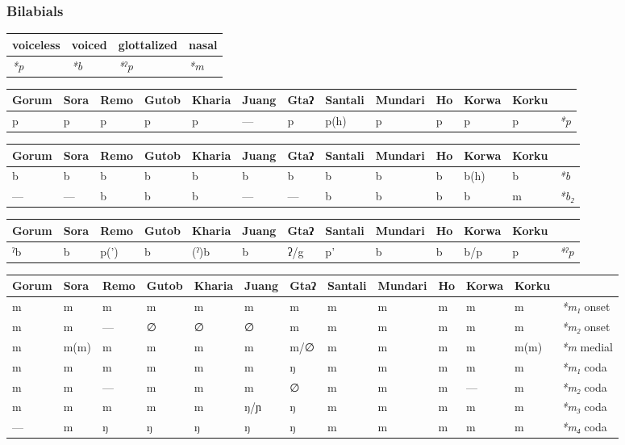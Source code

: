 \documentclass[a4paper,]{article}
\begin{document}
\subsubsection{Bilabials}\label{bilabials}

\begin{longtable}[]{@{}llll@{}}
\toprule
voiceless & voiced & glottalized & nasal\tabularnewline
\midrule
\endhead
\emph{*p} & \emph{*b} & \emph{*ˀp} & \emph{*m}\tabularnewline
\bottomrule
\end{longtable}

\begin{longtable}[]{@{}lllllllllllll@{}}
\toprule
Gorum & Sora & Remo & Gutob & Kharia & Juang & Gtaʔ & Santali & Mundari
& Ho & Korwa & Korku &\tabularnewline
\midrule
\endhead
p & p & p & p & p & --- & p & p(h) & p & p & p & p &
\emph{*p}\tabularnewline
\bottomrule
\end{longtable}

\begin{longtable}[]{@{}lllllllllllll@{}}
\toprule
Gorum & Sora & Remo & Gutob & Kharia & Juang & Gtaʔ & Santali & Mundari
& Ho & Korwa & Korku &\tabularnewline
\midrule
\endhead
b & b & b & b & b & b & b & b & b & b & b(h) & b &
\emph{*b}\tabularnewline
--- & --- & b & b & b & --- & --- & b & b & b & b & m &
\emph{*b₂}\tabularnewline
\bottomrule
\end{longtable}

\begin{longtable}[]{@{}lllllllllllll@{}}
\toprule
Gorum & Sora & Remo & Gutob & Kharia & Juang & Gtaʔ & Santali & Mundari
& Ho & Korwa & Korku &\tabularnewline
\midrule
\endhead
ˀb & b & p(') & b & (ˀ)b & b & ʔ/g & p' & b & b & b/p & p &
\emph{*ˀp}\tabularnewline
\bottomrule
\end{longtable}

\begin{longtable}[]{@{}lllllllllllll@{}}
\toprule
Gorum & Sora & Remo & Gutob & Kharia & Juang & Gtaʔ & Santali & Mundari
& Ho & Korwa & Korku &\tabularnewline
\midrule
\endhead
m & m & m & m & m & m & m & m & m & m & m & m & \emph{*m₁}
onset\tabularnewline
m & m & --- & ∅ & ∅ & ∅ & m & m & m & m & m & m & \emph{*m₂}
onset\tabularnewline
m & m(m) & m & m & m & m & m/∅ & m & m & m & m & m(m) & \emph{*m}
medial\tabularnewline
m & m & m & m & m & m & ŋ & m & m & m & m & m & \emph{*m₁}
coda\tabularnewline
m & m & --- & m & m & m & ∅ & m & m & m & --- & m & \emph{*m₂}
coda\tabularnewline
m & m & m & m & m & ŋ/ɲ & ŋ & m & m & m & m & m & \emph{*m₃}
coda\tabularnewline
--- & m & ŋ & ŋ & ŋ & ŋ & ŋ & m & m & m & m & m & \emph{*m₄}
coda\tabularnewline
\bottomrule
\end{longtable}
\end{document}
